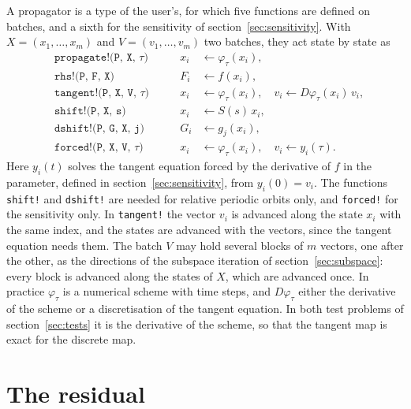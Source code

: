 \documentclass[11pt,a4paper]{article}
\newcommand{\code}[1]{\texttt{#1}}
\begin{document}
A propagator is a type of the user's, for which five functions are defined on batches, and a
sixth for the sensitivity of section~\ref{sec:sensitivity}. With
$X = (x_1, \dots, x_m)$ and $V = (v_1, \dots, v_m)$ two batches, they act state by state as
\begin{equation}
  \begin{aligned}
    &\code{propagate!(P, X, $\tau$)} &\qquad x_i &\leftarrow \varphi_\tau(x_i), \\
    &\code{rhs!(P, F, X)}            &\qquad F_i &\leftarrow f(x_i), \\
    &\code{tangent!(P, X, V, $\tau$)} &\qquad x_i &\leftarrow \varphi_\tau(x_i), \quad
      v_i \leftarrow D\varphi_\tau(x_i)\, v_i, \\
    &\code{shift!(P, X, s)}          &\qquad x_i &\leftarrow S(s)\, x_i, \\
    &\code{dshift!(P, G, X, j)}      &\qquad G_i &\leftarrow g_j(x_i), \\
    &\code{forced!(P, X, V, $\tau$)} &\qquad x_i &\leftarrow \varphi_\tau(x_i), \quad
      v_i \leftarrow y_i(\tau).
  \end{aligned}
\end{equation}
Here $y_i(t)$ solves the tangent equation forced by the derivative of $f$ in the parameter,
defined in section~\ref{sec:sensitivity}, from $y_i(0) = v_i$. The functions \code{shift!} and
\code{dshift!} are needed for relative periodic orbits only, and \code{forced!} for the
sensitivity only. In \code{tangent!} the vector $v_i$ is
advanced along the state $x_i$ with the same index, and the states are advanced with the vectors,
since the tangent equation needs them. The batch $V$ may hold several blocks of $m$ vectors, one
after the other, as the directions of the subspace iteration of section~\ref{sec:subspace}: every
block is advanced along the states of $X$, which are advanced once. In practice $\varphi_\tau$ is a numerical scheme with time
steps, and $D\varphi_\tau$ either the derivative of the scheme or a discretisation of the tangent
equation. In both test problems of section~\ref{sec:tests} it is the derivative of the scheme, so
that the tangent map is exact for the discrete map.

\section{The residual}
\label{sec:residual}
\end{document}
